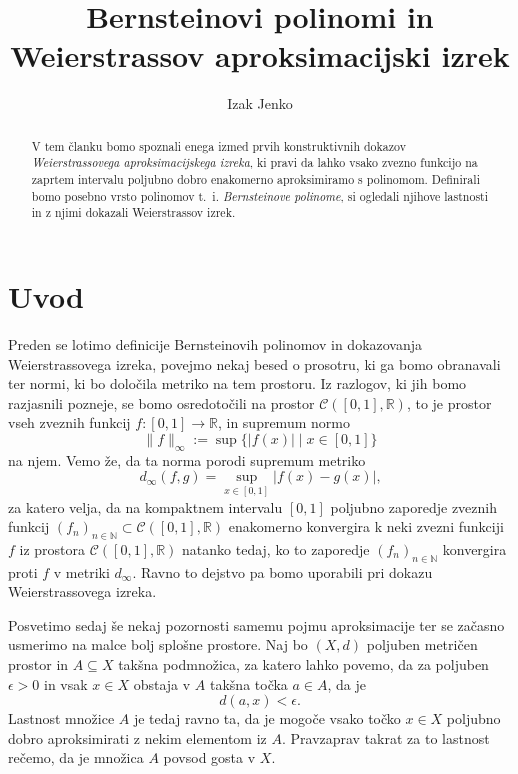 \documentclass[a4paper]{amsart}
\theoremstyle{theorem}
\theoremstyle{definition}
\begin{document}
\title{Bernsteinovi polinomi in Weierstrassov aproksimacijski izrek}
\author{Izak Jenko}

\maketitle
\thispagestyle{empty}

\begin{abstract}
	V tem članku bomo spoznali enega izmed prvih konstruktivnih dokazov 
	\emph{Weierstrassovega aproksimacijskega izreka}, ki pravi da lahko vsako zvezno 
	funkcijo na zaprtem intervalu poljubno dobro enakomerno aproksimiramo s polinomom. 
	Definirali bomo posebno vrsto polinomov t.~i. \emph{Bernsteinove polinome}, si ogledali
	njihove lastnosti in z njimi dokazali Weierstrassov izrek.
\end{abstract}

\newcommand{\RR}{\mathbb{R}}
\newcommand{\NN}{\mathbb{N}}
\newcommand{\CIR}{\mathcal{C}([0,1],\RR)}
\newcommand{\dinf}{d_{\infty}}

\section{Uvod}

Preden se lotimo definicije Bernsteinovih polinomov in dokazovanja Weierstrassovega
izreka, povejmo nekaj besed o prosotru, ki ga bomo obranavali ter normi, ki bo
določila metriko na tem prostoru. Iz razlogov, ki jih bomo razjasnili pozneje, se bomo
osredotočili na prostor $\mathcal{C}([0,1],\mathbb{R})$, to je prostor vseh zveznih
funkcij $f: [0,1] \to \RR$, in supremum normo
$$\|f\|_{\infty} := \sup \{|f(x)|\mid x \in [0,1]\}$$
na njem. Vemo že, da ta norma porodi supremum metriko
$$\dinf (f, g) = 
\sup_{x \in [0,1]} |f(x) - g(x)| \text{,}$$
za katero velja, da na kompaktnem intervalu $[0,1]$ poljubno zaporedje zveznih funkcij 
$(f_n)_{n \in \NN} \subset \CIR$ enakomerno konvergira k neki zvezni funkciji 
$f$ iz prostora $\CIR$
natanko tedaj, ko to zaporedje $(f_n)_{n \in \NN}$ konvergira proti $f$ v metriki $\dinf$.
Ravno to dejstvo pa bomo uporabili pri dokazu Weierstrassovega izreka. 
\par
Posvetimo sedaj še nekaj pozornosti samemu pojmu aproksimacije ter se začasno usmerimo
na malce bolj splošne prostore. Naj bo $(X, d)$ poljuben metričen prostor in $A \subseteq X$
takšna podmnožica, za katero lahko povemo, da za poljuben $\epsilon > 0$ in vsak $x \in X$ 
obstaja v $A$ takšna točka $a \in A$, da je $$d(a, x) < \epsilon\text{.}$$ Lastnost množice
$A$ je tedaj ravno ta, da je mogoče vsako točko $x \in X$ poljubno dobro aproksimirati
z nekim elementom iz $A$. Pravzaprav takrat za to lastnost rečemo, da je množica $A$
povsod gosta v $X$. 
\end{document}
